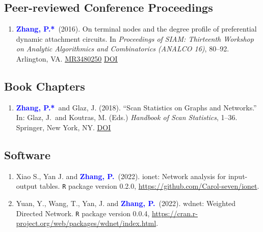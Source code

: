 \documentclass[12pt]{article}
\def\MR#1{\href{http://www.ams.org/mathscinet-getitem?mr=#1}{MR#1}}
\newcommand{\PZ}{\textbf{\textcolor{blue}{Zhang, P.*}}}
\newcommand{\PZnot}{\textbf{\textcolor{blue}{Zhang, P.}}}
\begin{document}
	\subsection*{Peer-reviewed Conference Proceedings}
	\begin{enumerate}
		\item \PZ\ (2016). On terminal nodes and the degree 
		profile of preferential dynamic attachment circuits. In 
		\emph{Proceedings of SIAM: Thirteenth Workshop on Analytic 
		Algorithmics and Combinatorics (ANALCO 16)}, 80--92. Arlington, VA. \MR{3480250}
		\href{https://doi.org/10.1137/1.9781611974324.9}
		{\underline{DOI}}	
	\end{enumerate}
	
	\subsection*{Book Chapters}
	\begin{enumerate}
		\item \PZ\ and {\sc Glaz, J.} (2018). ``Scan 
		Statistics on Graphs and Networks.'' In: Glaz, J.\ and Koutras, M. (Eds.) {\em Handbook of Scan Statistics}, 1--36. Springer, New York, NY. 
		\href{https://doi.org/10.1007/978-1-4614-8414-1_43-1}
		{\underline{DOI}}	
	\end{enumerate}
	
	\subsection*{Software}
	\begin{enumerate}
		\item{\sc Xiao S., Yan J.} and \PZnot\ (2022).
		ionet: Network analysis for input-output tables. {\tt R} package version 0.2.0, \url{https://github.com/Carol-seven/ionet}.
		
		\item {\sc Yuan, Y., Wang, T., Yan, J.} and \PZnot\ (2022). 
		wdnet: Weighted Directed Network. {\tt R} package version 0.0.4, \url{https://cran.r-project.org/web/packages/wdnet/index.html}.
	\end{enumerate}
	
\end{document}

